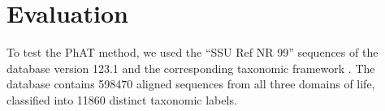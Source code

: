 
\section{Evaluation}
\label{ch:AutomaticTrees:sec:Evaluation}



To test the \acf{PhAT} method,
we used the ``SSU Ref NR 99'' sequences of the  database \citep{Quast2013} version 123.1
and the corresponding taxonomic framework \citep{Yilmaz2014}.
The database contains \num{598 470} aligned sequences from all three domains of life,
classified into \num{11 860} distinct taxonomic labels.

